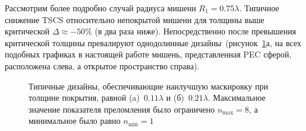 Рассмотрим более подробно случай радиуса мишени ${R_1 =
  0.75\lambda}$. Типичное снижение TSCS относительно непокрытой мишени
для толщины выше критической ${\Delta \approx -50\%}$ (в два раза
ниже). Непосредственно после превышения критической толщины
превалируют однодолинные дизайны~(рисунок~\ref{img:designs}а, на
всех подобных графиках в настоящей работе мишень, представленная PEC
сферой, расположена слева, а открытое пространство справа).
\begin{figure}
  \hfill
  \begin{minipage}[ht]{0.44\linewidth}
  \end{minipage}
  \hfill
  \begin{minipage}[ht]{0.44\linewidth}
  \end{minipage}
  \caption{Типичные дизайны, обеспечивающие наилучшую маскировку при
    толщине покрытия, равной (a)~$0.11\lambda$ и
    (б)~$0.21\lambda$. Максимальное значение показателя преломления
    было ограничено $n_{\mathrm{max}}=8$, а минимальное было
    равно $n_{\mathrm{min}}=1$ }
  \label{img:designs}  
\end{figure}
